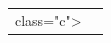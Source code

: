 \documentclass[a4paper,11pt,french]{article}
\makeatletter
\newcommand{\hmwkTitle}{Transchiffrement} %
\newcommand{\hmwkClass}{Master 2 SSI } %
\newcommand{\hmwkDocName}{Spécification Technique du Besoin} %
\newcommand{\version}{1.0} %
\newcommand{\docDate}{27 novembre 2011} %
\newcommand{\checked}{} %
\newcommand{\approved}{} %
\newcommand{\resettranslate}{\let\translate\@firstofone}
\makeatother
\begin{document}
\begin{tabular}{|m{8cm}|m{8cm}|}
class="c">%
\end{tabular}
\end{document}
